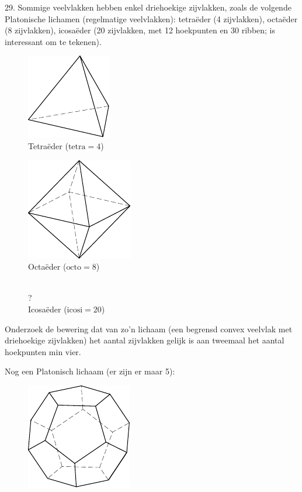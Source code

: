 \begin{problem}{29.}
	Sommige veelvlakken hebben enkel driehoekige zijvlakken, zoals de volgende Platonische lichamen (regelmatige veelvlakken): tetraëder (4 zijvlakken), octaëder (8 zijvlakken), icosaëder (20 zijvlakken, met 12 hoekpunten en 30 ribben; is interessant om te tekenen).
	\begin{figure}
		\footnotesize
		\null\hfill
		\parbox{0.3\linewidth}{\centering\includegraphics{resources/taskbook-131}\\Tetraëder ($\text{tetra} = 4$)}
		\hfill
		\parbox{0.3\linewidth}{\centering\includegraphics{resources/taskbook-132}\\Octaëder ($\text{octo} = 8$)}
		\hfill\null\\
		{\Huge ?}\\Icosaëder ($\text{icosi} = 20$)
	\end{figure}
	Onderzoek de bewering dat van zo'n lichaam (een begrensd convex veelvlak met driehoekige zijvlakken) het aantal zijvlakken gelijk is aan tweemaal het aantal hoekpunten min vier.
\end{problem}

\clearpage

\noindent Nog een Platonisch lichaam (er zijn er maar 5):
\begin{figure}
	\includegraphics{resources/taskbook-14}
\end{figure}

